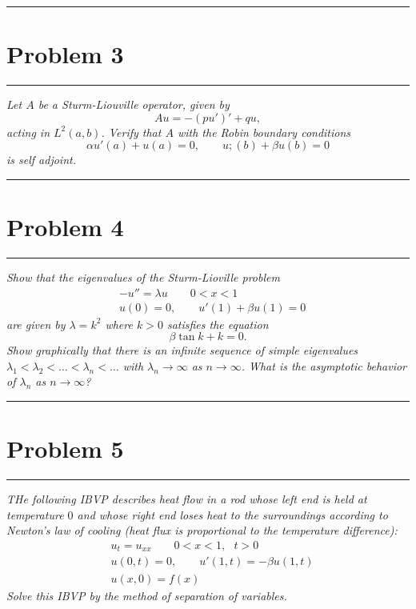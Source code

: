 \documentclass{article} %
\theoremstyle{plain}
\newcommand{\problem}[1]{
\vspace{.375cm}
\begin{minipage}{\textwidth}
    \begin{center}
        \noindent\rule{5cm}{1pt}
    \end{center}
    \section{\bf #1}
    \begin{center}
        \noindent\rule{5cm}{1pt}
    \end{center}
    \vspace{0.25cm}
\end{minipage}
}
\numberwithin{equation}{section} %
\numberwithin{figure}{section} %
\numberwithin{table}{section} %
\begin{document}
\problem{Problem 3}
\emph{Let $A$ be a Sturm-Liouville operator, given by $$Au = -(pu')' + qu,$$ acting in $L^2(a,b)$.  Verify that $A$ with the Robin boundary conditions $$\alpha u'(a) + u(a) = 0, \qquad u;(b) + \beta u(b) = 0$$ is self adjoint.}

\problem{Problem 4}
\emph{Show that the eigenvalues of the Sturm-Lioville problem}
\begin{align*}
    &-u'' = \lambda u \qquad 0 < x < 1 \\ &u(0) = 0, \qquad u'(1) + \beta u(1) = 0
\end{align*}
\emph{are given by $\lambda = k^2$ where $k > 0$ satisfies the equation $$ \beta \tan k + k = 0.$$  Show graphically that there is an infinite sequence of simple eigenvalues $\lambda_1 < \lambda_2 < \dots < \lambda_n < \dots$ with $\lambda_n \rightarrow \infty$ as $n \rightarrow \infty$.  What is the asymptotic behavior of $\lambda_n$ as $n \rightarrow \infty$?}

\problem{Problem 5}
\emph{THe following IBVP describes heat flow in a rod whose left end is held at temperature $0$ and whose right end loses heat to the surroundings according to Newton's law of cooling (heat flux is proportional to the temperature difference):}
\begin{align*}
    &u_t = u_{xx} \qquad 0 < x < 1,\ \ \ t > 0 \\
    &u(0, t) = 0, \qquad u'(1, t) = -\beta u(1,t) \\
    &u(x,0) = f(x)
\end{align*}
\emph{Solve this IBVP by the method of separation of variables.}
\end{document}
